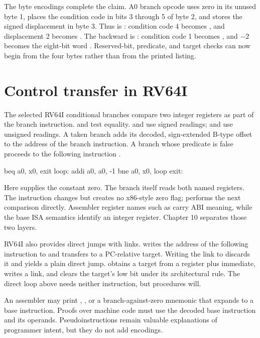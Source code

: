 The byte encodings complete the claim. A0 branch opcode  uses zero in
its unused byte 1, places the condition code in bits 3 through 5 of byte 2,
and stores the signed displacement in byte 3. Thus  is
: condition code 4 becomes , and displacement 2
becomes . The backward  is
: condition code 1 becomes , and \(-2\) becomes
the eight-bit word . Reserved-bit, predicate, and target checks can
now begin from the four bytes rather than from the printed listing.

\section{Control transfer in RV64I}

The selected RV64I conditional branches compare two integer registers as part
of the branch instruction.  and  test equality.
 and  use signed readings;  and 
use unsigned readings. A taken branch adds its decoded, sign-extended B-type
offset to the address of the branch instruction. A branch whose predicate is
false proceeds
to the following instruction \autocite{riscv2026unpriv}.

\begin{codelisting}[language={},caption={RV64I counts a0 down to zero}]
    beq  a0, x0, exit
loop:
    addi a0, a0, -1
    bne  a0, x0, loop
exit:
\end{codelisting}

Here  supplies the constant zero. The branch itself reads both named
registers. The  instruction changes  but creates no
x86-style zero flag;  performs the next comparison directly.
Assembler register names such as  carry ABI meaning, while the base
ISA semantics identify an integer register. Chapter 10 separates those two
layers.

RV64I also provides direct jumps with links.  writes the
address of the following instruction to  and transfers to a
PC-relative target. Writing the link to  discards it and yields a
plain direct jump.  obtains a target from a register plus immediate,
writes a link, and clears the target's low bit under its architectural rule.
The direct loop above needs neither instruction, but procedures will.

\begin{sidebar}[title={A pseudoinstruction is not another semantic primitive}]
An assembler may print , , or a branch-against-zero
mnemonic that expands to a base instruction. Proofs over machine code must use
the decoded base instruction and its operands. Pseudoinstructions remain
valuable explanations of programmer intent, but they do not add encodings.
\end{sidebar}

